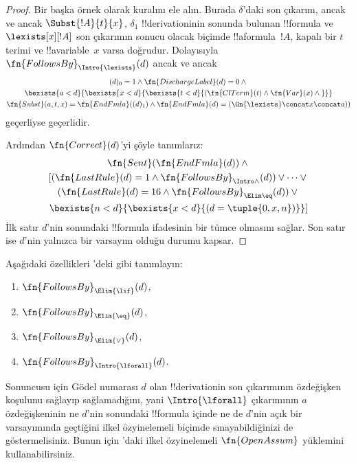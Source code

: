 \documentclass[../../../include/open-logic-section]{subfiles}
\begin{document}
\begin{proof}
  Bir başka örnek olarak \Intro{\lexists} kuralını ele alın. Burada
  $\delta$'daki son çıkarım, ancak ve ancak $\Subst{!A}{t}{x}$,
  $\delta_1$ !!{derivation}{}inin sonunda bulunan !!{formula} ve
  $\lexists[x][!A]$ son çıkarımın sonucu olacak biçimde !!a{formula}~$!A$,
  kapalı bir $t$ terimi ve !!a{variable}~$x$ varsa doğrudur. Dolayısıyla
  $\fn{FollowsBy}_{\Intro{\lexists}}(d)$ ancak ve ancak
  \begin{multline*}
    (d)_0 = 1 \land \fn{DischargeLabel}(d) = 0 \land {} \\
    \bexists{a < d}{\bexists{x<d}{\bexists{t<d}{
          (\fn{ClTerm}(t) \land \fn{Var}(x)  \land {}}}}\\
    \fn{Subst}(a,t,x) = \fn{EndFmla}((d)_1) \land
    \fn{EndFmla}(d) = (\Gn{\lexists} \concat x \concat a))
  \end{multline*}
  geçerliyse geçerlidir.

  Ardından $\fn{Correct}(d)$'yi şöyle tanımlarız:
  \begin{multline*}
    \fn{Sent}(\fn{EndFmla}(d)) \land {}\\
    [(\fn{LastRule}(d) = 1 \land
    \fn{FollowsBy}_{\Intro\land}(d)) \lor \dots \lor {}\\
    (\fn{LastRule}(d) = 16 \land \fn{FollowsBy}_{\Elim\eq}(d)) \lor {}\\
    \bexists{n<d}{\bexists{x<d}{(d = \tuple{0, x, n})}}]
  \end{multline*}
  İlk satır $d$'nin sonundaki !!{formula} ifadesinin bir tümce olmasını sağlar. Son satır
  ise $d$'nin yalnızca bir varsayım olduğu durumu kapsar.
\end{proof}

\begin{prob}
  Aşağıdaki özellikleri 'deki gibi
  tanımlayın:
  \begin{enumerate}
  \item $\fn{FollowsBy}_{\Elim{\lif}}(d)$,
  \item $\fn{FollowsBy}_{\Elim{\eq}}(d)$,
  \item $\fn{FollowsBy}_{\Elim{\lor}}(d)$,
  \item $\fn{FollowsBy}_{\Intro{\lforall}}(d)$.
  \end{enumerate}
  Sonuncusu için Gödel numarası $d$ olan !!{derivation}{}in son çıkarımının
  özdeğişken koşulunu sağlayıp sağlamadığını, yani
  $\Intro{\lforall}$ çıkarımının $a$ özdeğişkeninin ne $d$'nin sonundaki
  !!{formula} içinde ne de $d$'nin açık bir varsayımında geçtiğini ilkel
  özyinelemeli biçimde sınayabildiğinizi de göstermelisiniz. Bunun için
  'daki ilkel özyinelemeli
  $\fn{OpenAssum}$ yüklemini kullanabilirsiniz.
\end{prob}
\end{document}
